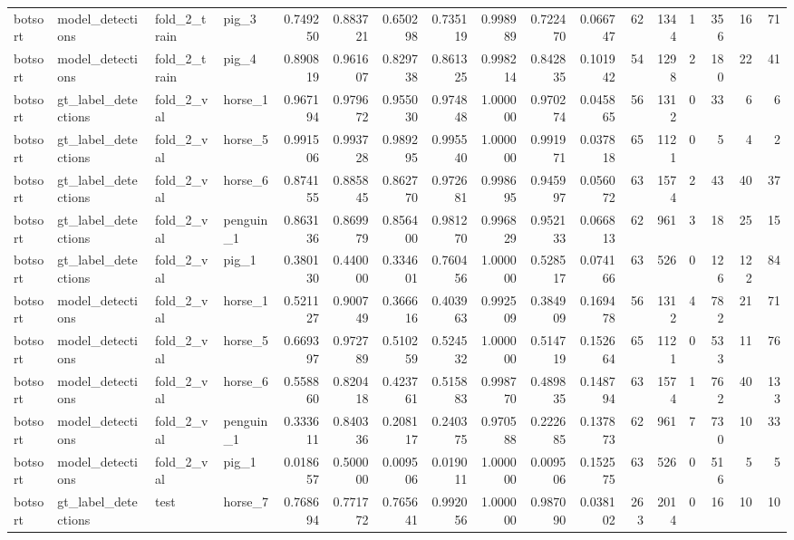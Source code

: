 \begin{table}
\begin{tabular}{llllrrrrrrrrrrrrr}
botsort & model_detections & fold_2_train & pig_3 & 0.749250 & 0.883721 & 0.650298 & 0.735119 & 0.998989 & 0.722470 & 0.066747 & 62 & 1344 & 1 & 356 & 16 & 71 \\
botsort & model_detections & fold_2_train & pig_4 & 0.890819 & 0.961607 & 0.829738 & 0.861325 & 0.998214 & 0.842835 & 0.101942 & 54 & 1298 & 2 & 180 & 22 & 41 \\
botsort & gt_label_detections & fold_2_val & horse_1 & 0.967194 & 0.979672 & 0.955030 & 0.974848 & 1.000000 & 0.970274 & 0.045865 & 56 & 1312 & 0 & 33 & 6 & 6 \\
botsort & gt_label_detections & fold_2_val & horse_5 & 0.991506 & 0.993728 & 0.989295 & 0.995540 & 1.000000 & 0.991971 & 0.037818 & 65 & 1121 & 0 & 5 & 4 & 2 \\
botsort & gt_label_detections & fold_2_val & horse_6 & 0.874155 & 0.885845 & 0.862770 & 0.972681 & 0.998695 & 0.945997 & 0.056072 & 63 & 1574 & 2 & 43 & 40 & 37 \\
botsort & gt_label_detections & fold_2_val & penguin_1 & 0.863136 & 0.869979 & 0.856400 & 0.981270 & 0.996829 & 0.952133 & 0.066813 & 62 & 961 & 3 & 18 & 25 & 15 \\
botsort & gt_label_detections & fold_2_val & pig_1 & 0.380130 & 0.440000 & 0.334601 & 0.760456 & 1.000000 & 0.528517 & 0.074166 & 63 & 526 & 0 & 126 & 122 & 84 \\
botsort & model_detections & fold_2_val & horse_1 & 0.521127 & 0.900749 & 0.366616 & 0.403963 & 0.992509 & 0.384909 & 0.169478 & 56 & 1312 & 4 & 782 & 21 & 71 \\
botsort & model_detections & fold_2_val & horse_5 & 0.669397 & 0.972789 & 0.510259 & 0.524532 & 1.000000 & 0.514719 & 0.152664 & 65 & 1121 & 0 & 533 & 11 & 76 \\
botsort & model_detections & fold_2_val & horse_6 & 0.558860 & 0.820418 & 0.423761 & 0.515883 & 0.998770 & 0.489835 & 0.148794 & 63 & 1574 & 1 & 762 & 40 & 133 \\
botsort & model_detections & fold_2_val & penguin_1 & 0.333611 & 0.840336 & 0.208117 & 0.240375 & 0.970588 & 0.222685 & 0.137873 & 62 & 961 & 7 & 730 & 10 & 33 \\
botsort & model_detections & fold_2_val & pig_1 & 0.018657 & 0.500000 & 0.009506 & 0.019011 & 1.000000 & 0.009506 & 0.152575 & 63 & 526 & 0 & 516 & 5 & 5 \\
botsort & gt_label_detections & test & horse_7 & 0.768694 & 0.771772 & 0.765641 & 0.992056 & 1.000000 & 0.987090 & 0.038102 & 263 & 2014 & 0 & 16 & 10 & 10 \\

\end{tabular}
\end{table}
